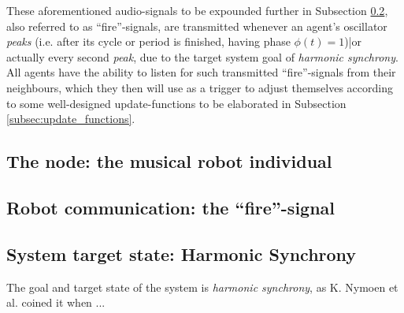 	These aforementioned audio-signals to be expounded further in Subsection \ref{subsec:fire_signal}, also referred to as ``fire''-signals, are transmitted whenever an agent's oscillator \textit{peaks} (i.e. after its cycle or period is finished, having phase $\phi(t)=1$)|or actually every second \textit{peak}, due to the target system goal of \textit{harmonic synchrony}. All agents have the ability to listen for such transmitted ``fire''-signals from their neighbours, which they then will use as a trigger to adjust themselves according to some well-designed update-functions to be elaborated in Subsection \ref{subsec:update_functions}.




	\subsection{The node: the musical robot individual}
	\label{subsec:node}

	\subsection{Robot communication: the ``fire''-signal}
	\label{subsec:fire_signal}

	\subsection{System target state: Harmonic Synchrony}
	\label{subsec:harmonic_synchrony}
	The goal and target state of the system is \textit{harmonic synchrony}, as K. Nymoen et al. \cite{nymoen_synch} coined it when ...
	
